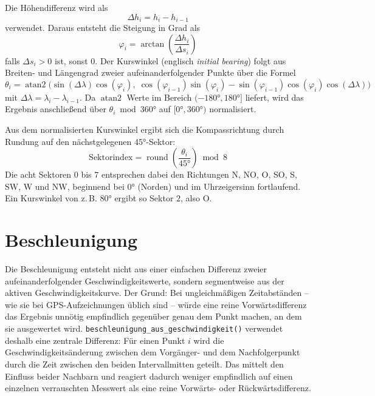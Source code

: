 Die Höhendifferenz wird als
\begin{equation}
\Delta h_i = h_i - h_{i-1}
\end{equation}
verwendet. Daraus entsteht die Steigung in Grad als
\begin{equation}
\varphi_i = \arctan\!\left(\frac{\Delta h_i}{\Delta s_i}\right)
\end{equation}
falls $\Delta s_i > 0$ ist, sonst $0$. 
Der Kurswinkel (englisch \emph{initial bearing}) folgt aus Breiten- und Längengrad
zweier aufeinanderfolgender Punkte über die Formel
\begin{equation}
    \theta_i = \operatorname{atan2}\Big(
        \sin(\Delta\lambda)\cos(\varphi_i),\;
        \cos(\varphi_{i-1})\sin(\varphi_i) - \sin(\varphi_{i-1})\cos(\varphi_i)\cos(\Delta\lambda)
    \Big)
    \label{eq:kurswinkel}
\end{equation}
mit $\Delta\lambda = \lambda_i - \lambda_{i-1}$. Da $\operatorname{atan2}$ Werte im Bereich
$(-180\si{\degree}, 180\si{\degree}]$ liefert, wird das Ergebnis anschlie{\ss}end über
$\theta_i \bmod 360\si{\degree}$ auf $[0\si{\degree}, 360\si{\degree})$ normalisiert.

Aus dem normalisierten Kurswinkel ergibt sich die Kompassrichtung durch Rundung auf
den nächstgelegenen $45\si{\degree}$-Sektor:
\begin{equation}
    \text{Sektorindex} = \operatorname{round}\!\left(\frac{\theta_i}{45\si{\degree}}\right) \bmod 8
    \label{eq:kompasssektor}
\end{equation}
Die acht Sektoren $0$ bis $7$ entsprechen dabei den Richtungen N, NO, O, SO, S, SW, W
und NW, beginnend bei $0\si{\degree}$ (Norden) und im Uhrzeigersinn fortlaufend. Ein
Kurswinkel von z.\,B. $80\si{\degree}$ ergibt so Sektor $2$, also O.

\section{Beschleunigung}

Die Beschleunigung entsteht nicht aus einer einfachen Differenz zweier aufeinanderfolgender Geschwindigkeitswerte, sondern segmentweise aus der aktiven Geschwindigkeitskurve. Der Grund: Bei ungleichmäßigen Zeitabständen -- wie sie bei GPS-Aufzeichnungen üblich sind -- würde eine reine Vorwärtsdifferenz das Ergebnis unnötig empfindlich gegenüber genau dem Punkt machen, an dem sie ausgewertet wird. \texttt{beschleunigung\_aus\_geschwindigkeit()} verwendet deshalb eine zentrale Differenz: Für einen Punkt $i$ wird die Geschwindigkeitsänderung zwischen dem Vorgänger- und dem Nachfolgerpunkt durch die Zeit zwischen den beiden Intervallmitten geteilt. Das mittelt den Einfluss beider Nachbarn und reagiert dadurch weniger empfindlich auf einen einzelnen verrauschten Messwert als eine reine Vorwärts- oder Rückwärtsdifferenz.

